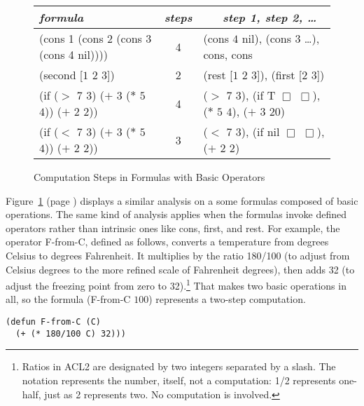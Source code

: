 \begin{figure}
\begin{center}
\begin{tabular}{lcl}
\hline
       \hspace*{5mm}\emph{formula}                            &\emph{steps}&~~~\emph{step 1, step 2, \dots}\\ \hline
    \textsf{(cons 1 (cons 2 (cons 3 (cons 4 nil))))}                   &     4      &\textsf{(cons $4$ nil)}, \textsf{(cons $3$ \dots)}, \textsf{cons}, \textsf{cons}\\
    \textsf{(second [$1$ $2$ $3$])}                                    &     2      &\textsf{(rest [$1$ $2$ $3$])}, \textsf{(first [$2$ $3$])}\\
    \textsf{(if ($>$ $7$ $3$) ($+$ $3$ ($*$ $5$ $4$)) ($+$ $2$ $2$))}  &     4      &\textsf{($>$ $7$ $3$)}, \textsf{(if T $\Box$ $\Box$)}, \textsf{($*$ $5$ $4$)}, \textsf{($+$ $3$ $20$)}\\
    \textsf{(if ($<$ $7$ $3$) ($+$ $3$ ($*$ $5$ $4$)) ($+$ $2$ $2$))}  &     3      &\textsf{($<$ $7$ $3$)}, \textsf{(if nil $\Box$ $\Box$)}, \textsf{($+$ $2$ $2$)}\\
\end{tabular}
\end{center}
\caption{Computation Steps in Formulas with Basic Operators}
\label{fig:basic-op-formulas}
\end{figure}

Figure~\ref{fig:basic-op-formulas} (page \pageref{fig:basic-op-formulas})
displays a similar analysis on a some formulas
composed of basic operations. The same kind of
analysis applies when the formulas invoke defined operators
rather than intrinsic ones like
\textsf{cons}, \textsf{first}, and \textsf{rest}.
For example, the operator \textsf{F-from-C}, defined
as follows, converts a temperature from degrees Celsius to
degrees Fahrenheit. It multiplies by the ratio \textsf{180/100}
(to adjust from Celsius degrees to the
more refined scale of Fahrenheit degrees), then adds 32
(to adjust the freezing point from zero to 32).\footnote{Ratios
in ACL2 are designated
by two integers separated by a slash.
The notation represents the number, itself, not a computation:
\textsf{1/2} represents one-half, just as \textsf{2} represents two.
No computation is involved.}
That makes two basic operations in all, so the formula
\textsf{(F-from-C $100$)} represents a two-step computation.

\begin{Verbatim}
(defun F-from-C (C)
  (+ (* 180/100 C) 32)))
\end{Verbatim}

